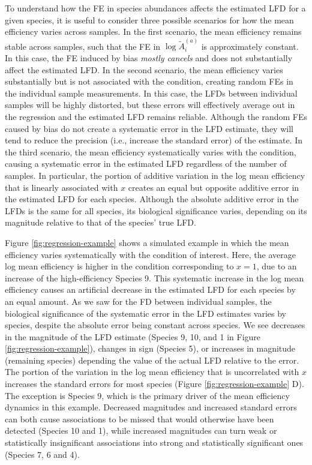 \documentclass[
]{article}
\begin{document}
To understand how the FE in species abundances affects the estimated LFD for a given species, it is useful to consider three possible scenarios for how the mean efficiency varies across samples.
In the first scenario, the mean efficiency remains stable across samples, such that the FE in \(\log \tilde A_{i}^{(a)}\) is approximately constant.
In this case, the FE induced by bias \emph{mostly cancels} and does not substantially affect the estimated LFD.
In the second scenario, the mean efficiency varies substantially but is not associated with the condition, creating random FEs in the individual sample measurements.
In this case, the LFDs between individual samples will be highly distorted, but these errors will effectively average out in the regression and the estimated LFD remains reliable.
Although the random FEs caused by bias do not create a systematic error in the LFD estimate, they will tend to reduce the precision (i.e., increase the standard error) of the estimate.
In the third scenario, the mean efficiency systematically varies with the condition, causing a systematic error in the estimated LFD regardless of the number of samples.
In particular, the portion of additive variation in the log mean efficiency that is linearly associated with \(x\) creates an equal but opposite additive error in the estimated LFD for each species.
Although the absolute additive error in the LFDs is the same for all species, its biological significance varies, depending on its magnitude relative to that of the species' true LFD.

Figure \ref{fig:regression-example} shows a simulated example in which the mean efficiency varies systematically with the condition of interest.
Here, the average log mean efficiency is higher in the condition corresponding to \(x=1\), due to an increase of the high-efficiency Species 9.
This systematic increase in the log mean efficiency causes an artificial decrease in the estimated LFD for each species by an equal amount.
As we saw for the FD between individual samples, the biological significance of the systematic error in the LFD estimates varies by species, despite the absolute error being constant across species.
We see decreases in the magnitude of the LFD estimate (Species 9, 10, and 1 in Figure \ref{fig:regression-example}), changes in sign (Species 5), or increases in magnitude (remaining species) depending the value of the actual LFD relative to the error.
The portion of the variation in the log mean efficiency that is uncorrelated with \(x\) increases the standard errors for most species (Figure \ref{fig:regression-example} D).
The exception is Species 9, which is the primary driver of the mean efficiency dynamics in this example.
Decreased magnitudes and increased standard errors can both cause associations to be missed that would otherwise have been detected (Species 10 and 1), while increased magnitudes can turn weak or statistically insignificant associations into strong and statistically significant ones (Species 7, 6 and 4).
\end{document}
